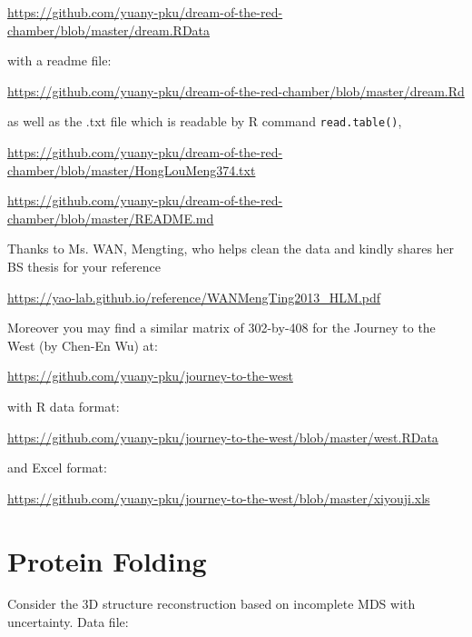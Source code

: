 \documentclass[11pt]{article}
\begin{document}
\url{https://github.com/yuany-pku/dream-of-the-red-chamber/blob/master/dream.RData}

\noindent with a readme file:

\url{https://github.com/yuany-pku/dream-of-the-red-chamber/blob/master/dream.Rd}

\noindent as well as the .txt file which is readable by R command {\tt read.table()},

\url{https://github.com/yuany-pku/dream-of-the-red-chamber/blob/master/HongLouMeng374.txt}

\url{https://github.com/yuany-pku/dream-of-the-red-chamber/blob/master/README.md}

Thanks to Ms. WAN, Mengting, who helps clean the data and kindly shares her BS thesis for your reference
 
\url{https://yao-lab.github.io/reference/WANMengTing2013_HLM.pdf}

%

Moreover you may find a similar matrix of 302-by-408 for the Journey to the West (by Chen-En Wu) at:

\url{https://github.com/yuany-pku/journey-to-the-west}

\noindent with R data format:

\url{https://github.com/yuany-pku/journey-to-the-west/blob/master/west.RData}

\noindent and Excel format:

\url{https://github.com/yuany-pku/journey-to-the-west/blob/master/xiyouji.xls}


\section{Protein Folding} 
Consider the 3D structure reconstruction based on incomplete MDS with uncertainty. Data file: 
\end{document}

